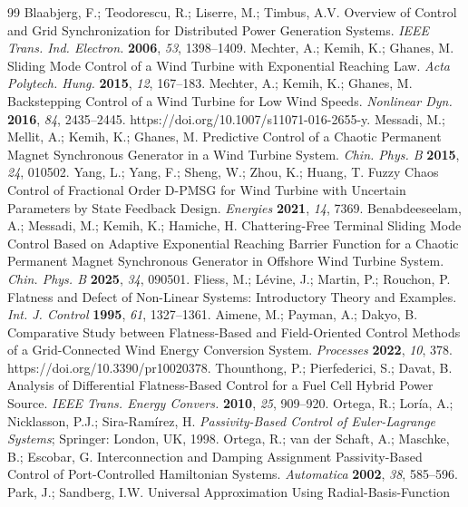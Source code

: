 \documentclass[11pt,a4paper]{article}
\begin{document}
\begin{thebibliography}{99}
 Blaabjerg, F.; Teodorescu, R.; Liserre, M.; Timbus, A.V. Overview of Control and
Grid Synchronization for Distributed Power Generation Systems. \emph{IEEE Trans. Ind. Electron.}
\textbf{2006}, \emph{53}, 1398--1409.
 Mechter, A.; Kemih, K.; Ghanes, M. Sliding Mode Control of a Wind Turbine with
Exponential Reaching Law. \emph{Acta Polytech. Hung.} \textbf{2015}, \emph{12}, 167--183.
 Mechter, A.; Kemih, K.; Ghanes, M. Backstepping Control of a Wind Turbine for Low
Wind Speeds. \emph{Nonlinear Dyn.} \textbf{2016}, \emph{84}, 2435--2445.
https://doi.org/10.1007/s11071-016-2655-y.
 Messadi, M.; Mellit, A.; Kemih, K.; Ghanes, M. Predictive Control of a Chaotic
Permanent Magnet Synchronous Generator in a Wind Turbine System. \emph{Chin. Phys. B} \textbf{2015},
\emph{24}, 010502.
 Yang, L.; Yang, F.; Sheng, W.; Zhou, K.; Huang, T. Fuzzy Chaos Control of Fractional
Order D-PMSG for Wind Turbine with Uncertain Parameters by State Feedback Design. \emph{Energies}
\textbf{2021}, \emph{14}, 7369.
 Benabdeeseelam, A.; Messadi, M.; Kemih, K.; Hamiche, H. Chattering-Free
Terminal Sliding Mode Control Based on Adaptive Exponential Reaching Barrier Function for a Chaotic
Permanent Magnet Synchronous Generator in Offshore Wind Turbine System. \emph{Chin. Phys. B}
\textbf{2025}, \emph{34}, 090501.
 Fliess, M.; L\'evine, J.; Martin, P.; Rouchon, P. Flatness and Defect of Non-Linear
Systems: Introductory Theory and Examples. \emph{Int. J. Control} \textbf{1995}, \emph{61}, 1327--1361.
 Aimene, M.; Payman, A.; Dakyo, B. Comparative Study between Flatness-Based and
Field-Oriented Control Methods of a Grid-Connected Wind Energy Conversion System. \emph{Processes}
\textbf{2022}, \emph{10}, 378. https://doi.org/10.3390/pr10020378.
 Thounthong, P.; Pierfederici, S.; Davat, B. Analysis of Differential
Flatness-Based Control for a Fuel Cell Hybrid Power Source. \emph{IEEE Trans. Energy Convers.}
\textbf{2010}, \emph{25}, 909--920.
 Ortega, R.; Lor\'ia, A.; Nicklasson, P.J.; Sira-Ram\'irez, H.
\emph{Passivity-Based Control of Euler-Lagrange Systems}; Springer: London, UK, 1998.
 Ortega, R.; van der Schaft, A.; Maschke, B.; Escobar, G. Interconnection and
Damping Assignment Passivity-Based Control of Port-Controlled Hamiltonian Systems. \emph{Automatica}
\textbf{2002}, \emph{38}, 585--596.
 Park, J.; Sandberg, I.W. Universal Approximation Using Radial-Basis-Function

\end{thebibliography}
\end{document}
